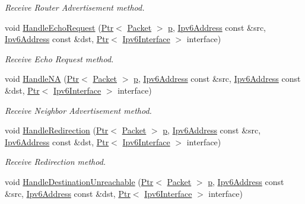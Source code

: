 \begin{DoxyCompactItemize}
\begin{DoxyCompactList}\small\item\em Receive Router Advertisement method. \end{DoxyCompactList}\item 
void \hyperlink{classns3_1_1Icmpv6L4Protocol_ac3f01017288992311264ef54c57e539b}{Handle\+Echo\+Request} (\hyperlink{classns3_1_1Ptr}{Ptr}$<$ \hyperlink{classns3_1_1Packet}{Packet} $>$ \hyperlink{lte__link__budget__x2__handover__measures_8m_ac9de518908a968428863f829398a4e62}{p}, \hyperlink{classns3_1_1Ipv6Address}{Ipv6\+Address} const \&src, \hyperlink{classns3_1_1Ipv6Address}{Ipv6\+Address} const \&dst, \hyperlink{classns3_1_1Ptr}{Ptr}$<$ \hyperlink{classns3_1_1Ipv6Interface}{Ipv6\+Interface} $>$ interface)
\begin{DoxyCompactList}\small\item\em Receive Echo Request method. \end{DoxyCompactList}\item 
void \hyperlink{classns3_1_1Icmpv6L4Protocol_a6c3a2ecce98fa29743eb177b613490e5}{Handle\+NA} (\hyperlink{classns3_1_1Ptr}{Ptr}$<$ \hyperlink{classns3_1_1Packet}{Packet} $>$ \hyperlink{lte__link__budget__x2__handover__measures_8m_ac9de518908a968428863f829398a4e62}{p}, \hyperlink{classns3_1_1Ipv6Address}{Ipv6\+Address} const \&src, \hyperlink{classns3_1_1Ipv6Address}{Ipv6\+Address} const \&dst, \hyperlink{classns3_1_1Ptr}{Ptr}$<$ \hyperlink{classns3_1_1Ipv6Interface}{Ipv6\+Interface} $>$ interface)
\begin{DoxyCompactList}\small\item\em Receive Neighbor Advertisement method. \end{DoxyCompactList}\item 
void \hyperlink{classns3_1_1Icmpv6L4Protocol_ac23066adbd141142fd8d6a86fa1cc4ef}{Handle\+Redirection} (\hyperlink{classns3_1_1Ptr}{Ptr}$<$ \hyperlink{classns3_1_1Packet}{Packet} $>$ \hyperlink{lte__link__budget__x2__handover__measures_8m_ac9de518908a968428863f829398a4e62}{p}, \hyperlink{classns3_1_1Ipv6Address}{Ipv6\+Address} const \&src, \hyperlink{classns3_1_1Ipv6Address}{Ipv6\+Address} const \&dst, \hyperlink{classns3_1_1Ptr}{Ptr}$<$ \hyperlink{classns3_1_1Ipv6Interface}{Ipv6\+Interface} $>$ interface)
\begin{DoxyCompactList}\small\item\em Receive Redirection method. \end{DoxyCompactList}\item 
void \hyperlink{classns3_1_1Icmpv6L4Protocol_ac7cc1db0945e6dc5be05c82a4aa746be}{Handle\+Destination\+Unreachable} (\hyperlink{classns3_1_1Ptr}{Ptr}$<$ \hyperlink{classns3_1_1Packet}{Packet} $>$ \hyperlink{lte__link__budget__x2__handover__measures_8m_ac9de518908a968428863f829398a4e62}{p}, \hyperlink{classns3_1_1Ipv6Address}{Ipv6\+Address} const \&src, \hyperlink{classns3_1_1Ipv6Address}{Ipv6\+Address} const \&dst, \hyperlink{classns3_1_1Ptr}{Ptr}$<$ \hyperlink{classns3_1_1Ipv6Interface}{Ipv6\+Interface} $>$ interface)

\end{DoxyCompactItemize}
